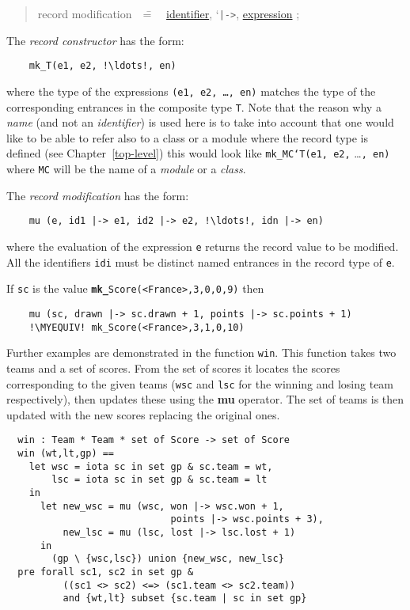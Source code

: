 \documentclass{overturerepchap}
\newcommand{\MYEQUIV}{$\equiv$}
\newcommand{\Lit}[1]{`{\tt #1}\Quote}
\newcommand{\Rule}[2]{
  \begin{quote}\begin{tabbing}
    #1\index{#1}\ \ \= = \ \ \= #2  ; %

  \end{tabbing}\end{quote}
  }
\newcommand{\Ruleref}[1]{
  \hyperlink{rule:#1}{#1}}
\newcommand{\keyw}[1]{{\bf\ttfamily #1}}
\begin{document}
{\begin{description}
  \Rule{record modification}{
    \Ruleref{identifier}, \Lit{|->}, \Ruleref{expression}
    }

\item[Semantics:] The {\it record constructor} has the form:
  \begin{lstlisting}
    mk_T(e1, e2, !\ldots!, en)
  \end{lstlisting}
  where the type of the expressions {\tt (e1, e2, \ldots, en)} matches the
  type of the corresponding entrances in the composite type {\tt T}. Note that the reason why a \emph{name} (and not an \emph{identifier}) is used here is to take into account that one would like to be able to refer also to a class or a module where the record type is defined (see Chapter~\ref{top-level}) this would look like {\tt mk\_MC`T(e1, e2,} \ldots{\tt , en)} where {\tt MC} will be the name of a \emph{module} or a \emph{class}.

  The {\it record modification} has the form:
  \begin{lstlisting}
    mu (e, id1 |-> e1, id2 |-> e2, !\ldots!, idn |-> en)
  \end{lstlisting}
  where the evaluation of the expression {\tt e} returns the record value
  to be modified. All the identifiers {\tt idi} must be distinct named
  entrances in the record type of {\tt e}.

\item[Examples:] If \texttt{sc} is the value \texttt{\keyw{mk\_}Score(<France>,3,0,0,9)} then
  \begin{lstlisting}
    mu (sc, drawn |-> sc.drawn + 1, points |-> sc.points + 1)
    !\MYEQUIV! mk_Score(<France>,3,1,0,10)
  \end{lstlisting}
  Further examples are demonstrated in the function \texttt{win}. This
  function takes two teams and a set of scores. From the set of scores
  it locates the scores corresponding to the given teams (\texttt{wsc}
  and \texttt{lsc} for the winning and losing team respectively), then
  updates these using the \keyw{mu} operator. The set of teams is then
  updated with the new scores replacing the original ones.
  \begin{lstlisting}
  win : Team * Team * set of Score -> set of Score
  win (wt,lt,gp) ==
    let wsc = iota sc in set gp & sc.team = wt,
        lsc = iota sc in set gp & sc.team = lt
    in
      let new_wsc = mu (wsc, won |-> wsc.won + 1,
                             points |-> wsc.points + 3),
          new_lsc = mu (lsc, lost |-> lsc.lost + 1)
      in
        (gp \ {wsc,lsc}) union {new_wsc, new_lsc}
  pre forall sc1, sc2 in set gp &
          ((sc1 <> sc2) <=> (sc1.team <> sc2.team))
          and {wt,lt} subset {sc.team | sc in set gp}
  \end{lstlisting}


\end{description}}
\end{document}
